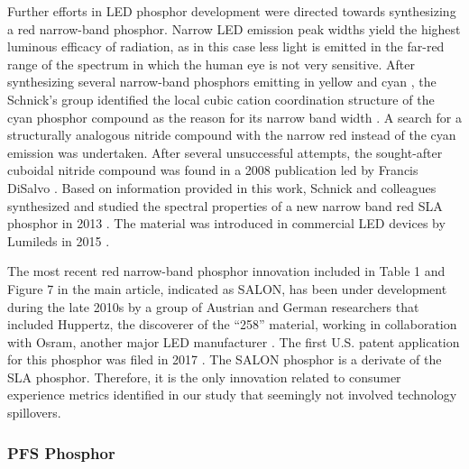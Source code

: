 \documentclass[10pt]{article}
\begin{document}
Further efforts in LED phosphor development were directed towards synthesizing a red narrow-band phosphor. Narrow LED emission peak widths yield the highest luminous efficacy of radiation, as in this case less light is emitted in the far-red range of the spectrum in which the human eye is not very sensitive. After synthesizing several narrow-band phosphors emitting in yellow \cite{Hppe2004} and cyan \cite{Kechele2009}, the Schnick’s group identified the local cubic cation coordination structure of the cyan phosphor compound as the reason for its narrow band width \cite{lumi2016narrow}. A search for a structurally analogous nitride compound with the narrow red instead of the cyan emission was undertaken. After several unsuccessful attempts, the sought-after cuboidal nitride compound was found in a 2008 publication led by Francis DiSalvo \cite{Park2008Sr}. Based on information provided in this work, Schnick and colleagues synthesized and studied the spectral properties of a new narrow band red SLA phosphor in 2013 \cite{schmidt2013new}\cite{Pust2014}\cite{schmidt2017phosphors}. The material was introduced in commercial LED devices by Lumileds in 2015 \cite{lumi2016narrow_whitepaper}. 

The most recent red narrow-band phosphor innovation included in Table 1 and Figure 7 in the main article, indicated as SALON, has been under development during the late 2010s by a group of Austrian and German researchers that included Huppertz, the discoverer of the “258” material, working in collaboration with Osram, another major LED manufacturer \cite{seibald2019phosphor}\cite{Hoerder2019}\cite{Hoerder2020}. The first U.S. patent application for this phosphor was filed in 2017 \cite{seibald2019phosphor}. The SALON phosphor is a derivate of the SLA phosphor. Therefore, it is the only innovation related to consumer experience metrics identified in our study that seemingly not involved technology spillovers.

\subsubsection{PFS Phosphor}
\end{document}
